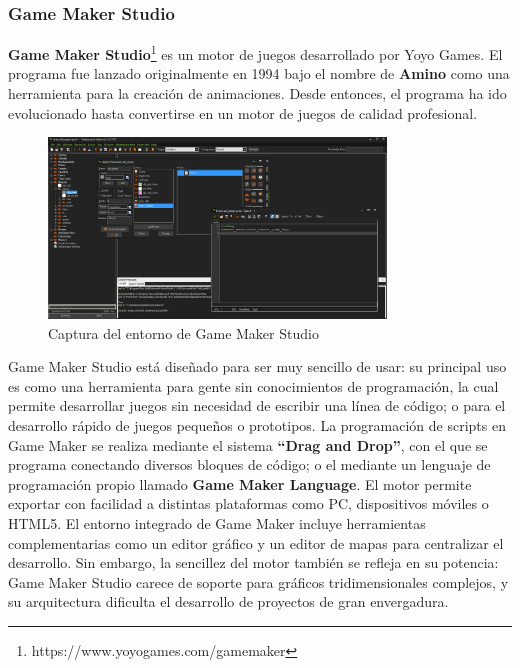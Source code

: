 \subsubsection{Game Maker Studio}
\textbf{Game Maker Studio}\footnote{https://www.yoyogames.com/gamemaker} es un motor de juegos desarrollado por Yoyo Games. El programa fue lanzado originalmente en 1994 bajo el nombre de \textbf{Amino} como una herramienta para la creación de animaciones. Desde entonces, el programa ha ido evolucionado hasta convertirse en un motor de juegos de calidad profesional.
\begin{figure}[h]
	\includegraphics[width=0.8\textwidth]{images/estadodelarte/motores/captura-game-maker}
	\centering
	\caption{Captura del entorno de Game Maker Studio}
\end{figure}

Game Maker Studio está diseñado para ser muy sencillo de usar: su principal uso es como una herramienta para gente sin conocimientos de programación, la cual permite desarrollar juegos sin necesidad de escribir una línea de código; o para el desarrollo rápido de juegos pequeños o prototipos. La programación de scripts en Game Maker se realiza mediante el sistema \textbf{``Drag and Drop''}, con el que se programa conectando diversos bloques de código; o el mediante un lenguaje de programación propio llamado \textbf{Game Maker Language}. El motor permite exportar con facilidad a distintas plataformas como PC, dispositivos móviles o HTML5. El entorno integrado de Game Maker incluye herramientas complementarias como un editor gráfico y un editor de mapas para centralizar el desarrollo. Sin embargo, la sencillez del motor también se refleja en su potencia: Game Maker Studio carece de soporte para gráficos tridimensionales complejos, y su arquitectura dificulta el desarrollo de proyectos de gran envergadura.

